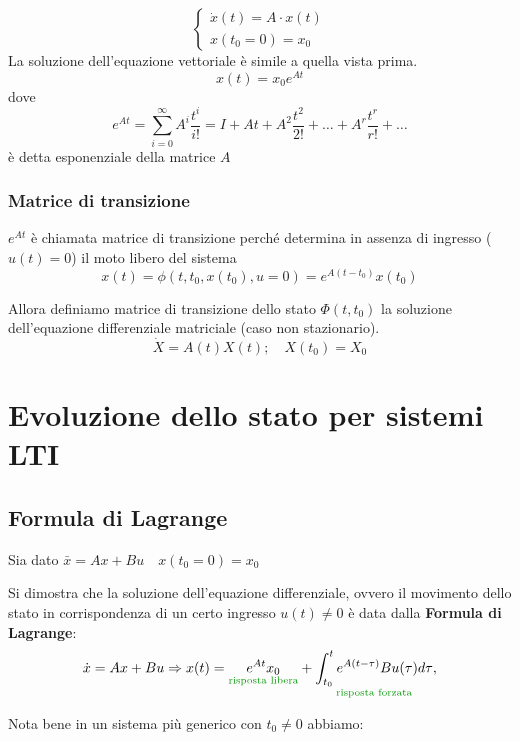\documentclass[a4paper,12pt]{article}
\begin{document}
	\[
	\begin{cases}
		\dot{x}(t) = A \cdot x(t) \\
		x(t_0 = 0) = x_0
	\end{cases}
	\]
	La soluzione dell'equazione vettoriale è simile a quella vista prima.
	\[
	 x(t) = x_0e^{At}
	\]
	dove 
	\[
	e^{At} = \sum_{i = 0}^{\infty} A^i\frac{t^i}{i!} = I + At + A^2\frac{t^2}{2!} + \dots + A^r \frac{t^r}{r!} + \dots 
	\]
	è detta esponenziale della matrice $A$
	\subsubsection{Matrice di transizione}
	$e^{At}$ è chiamata matrice di transizione perché determina in assenza di ingresso ($u(t) = 0$) il moto libero del sistema
	\[
		x(t) = \phi(t, t_0, x(t_0), u = 0) = e^{A(t-t_0)}x(t_0)
	\]
	
	Allora definiamo matrice di transizione dello stato $\varPhi(t, t_0)$ la soluzione dell'equazione differenziale matriciale (caso non stazionario).
	\[
		\dot{X} = A(t)X(t); \quad X(t_0) = X_0
	\]
	
	\section{Evoluzione dello stato per sistemi LTI}
	\subsection{Formula di Lagrange}
	Sia dato $\bar{x} = Ax + Bu \quad x(t_0 = 0) = x_0$
	
	Si dimostra che la soluzione dell'equazione differenziale, ovvero il movimento dello stato in corrispondenza di un certo ingresso $u(t) \neq 0$ è data dalla \textbf{Formula di Lagrange}:
	\[
	\dot{x} = Ax + Bu \Rightarrow x(t) = \underset{\textcolor{green!60!black}{\text{risposta libera}}}{e^{At}x_0} + \underset{\textcolor{green!60!black}{\text{risposta forzata}}}{\int_{t_0}^{t} e^{A(t-\tau)}Bu(\tau)d\tau},
	\]
	
	Nota bene in un sistema più generico con $t_0 \neq 0$ abbiamo:
	
\end{document}

